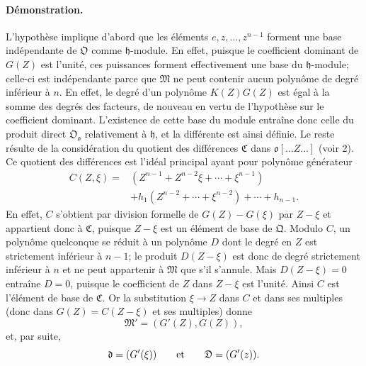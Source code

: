 \paragraph{Démonstration.}
L'hypothèse implique d'abord que les éléments \(e,z,\ldots,z^{n-1}\) forment une base indépendante de \(\mathfrak O\) comme \(\mathfrak h\)-module. En effet, puisque le coefficient dominant de \(G(Z)\) est l'unité, ces puissances forment effectivement une base du \(\mathfrak h\)-module; celle-ci est indépendante parce que \(\mathfrak M\) ne peut contenir aucun polynôme de degré inférieur à \(n\). En effet, le degré d'un polynôme \(K(Z)G(Z)\) est égal à la somme des degrés des facteurs, de nouveau en vertu de l'hypothèse sur le coefficient dominant. L'existence de cette base du module entraîne donc celle du produit direct \(\mathfrak O_{\mathfrak o}\) relativement à \(\mathfrak h\), et la différente est ainsi définie. Le reste résulte de la considération du quotient des différences \(\mathfrak C\) dans \(\mathfrak o[\ldots Z\ldots]\) (voir 2). Ce quotient des différences est l'idéal principal ayant pour polynôme générateur
\[
\begin{aligned}
C(Z,\xi)={}&(Z^{n-1}+Z^{n-2}\xi+\cdots+\xi^{n-1})\\
&+h_1(Z^{n-2}+\cdots+\xi^{n-2})+\cdots+h_{n-1}.
\end{aligned}
\]
En effet, \(C\) s'obtient par division formelle de \(G(Z)-G(\xi)\) par \(Z-\xi\) et appartient donc à \(\mathfrak C\), puisque \(Z-\xi\) est un élément de base de \(\mathfrak Q\). Modulo \(C\), un polynôme quelconque se réduit à un polynôme \(D\) dont le degré en \(Z\) est strictement inférieur à \(n-1\); le produit \(D(Z-\xi)\) est donc de degré strictement inférieur à \(n\) et ne peut appartenir à \(\mathfrak M\) que s'il s'annule. Mais \(D(Z-\xi)=0\) entraîne \(D=0\), puisque le coefficient de \(Z\) dans \(Z-\xi\) est l'unité. Ainsi \(C\) est l'élément de base de \(\mathfrak C\). Or la substitution \(\xi\to Z\) dans \(C\) et dans ses multiples (donc dans \(G(Z)=C(Z-\xi)\) et ses multiples) donne
\[
\mathfrak M'=(G'(Z),G(Z)),
\]
et, par suite,
\[
\mathfrak d=(G'(\xi))
\qquad\hbox{et}\qquad
\mathfrak D=(G'(z)).
\]
